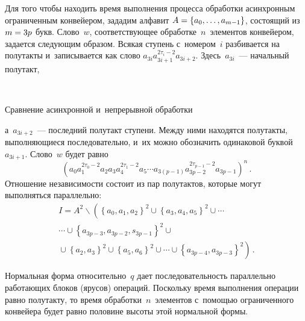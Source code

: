 \begin{multicols}{2}
  Для того чтобы находить время выполнения процесса обработки 
асинхронным ограниченным конвейером, зададим алфавит $A\hm= \{a_0, 
\ldots, a_{m-1}\}$, состоящий из $m\hm=3p$ букв. Слово~$w$, 
соответствующее обработке~$n$~элементов конвейером, задается 
следующим образом. Всякая ступень с~номером~$i$ разбивается на 
полутакты и~записывается как слово $a_{3i}a_{3i+1}^{2\tau_i-2} a_{3i+2}$. 
Здесь~$a_{3i}$~--- начальный полутакт,\linebreak\vspace*{-12pt}

{ \begin{center}  %
 \vspace*{-1pt}
    \mbox{%
 \epsfxsize=79.105mm 
 }


\vspace*{6pt}


\noindent
{\small Сравнение асинхронной и~непрерывной обработки}
\end{center}
}


\vspace*{12pt}




\noindent
 а~$a_{3i+2}$~--- последний 
полутакт ступени. Между ними находятся полутакты, выполняющиеся 
последовательно, и~их можно обозначить одинаковой буквой~$a_{3i+1}$. 
Слово~$w$ будет равно 
  $$
  \left( a_0 a_1^{2\tau_0-2} a_2 a_3 a_4^{2\tau_1-2} a_5\cdots a_{3(p-1)} 
  a_{3p-2}^{2\tau_{p-1}-2} a_{3p-1}\right)^n\,.
  $$
Отношение независимости состоит из пар полутактов, которые могут 
выполняться параллельно: 
\begin{multline*}
I=A^2\backslash \left( \left\{ a_0, a_1, a_2\right\}^2 \cup
\left\{ a_3, a_4, a_5\right\}^2 \cup\cdots \right.\\
\cdots \cup \left\{ a_{3p-3},
a_{3p-2}, s_{3p-1}\right\}^2\cup{}\\
\left.{}\cup \left\{ a_2, a_3\right\}^2 \cup
\left\{ a_5, a_6\right\}^2\cup \cdots \cup \left\{ a_{3p-4}, a_{3p-
3}\right\}^2\right)\,.
\end{multline*}
  
  Нормальная форма относительно~$q$ дает последовательность 
параллельно работающих блоков (ярусов) операций. Поскольку время 
выполнения операции равно полутакту, то время обработки~$n$~элементов 
с~по\-мощью ограниченного конвейера будет равно половине высоты этой 
нормальной формы.
  

\end{multicols}
